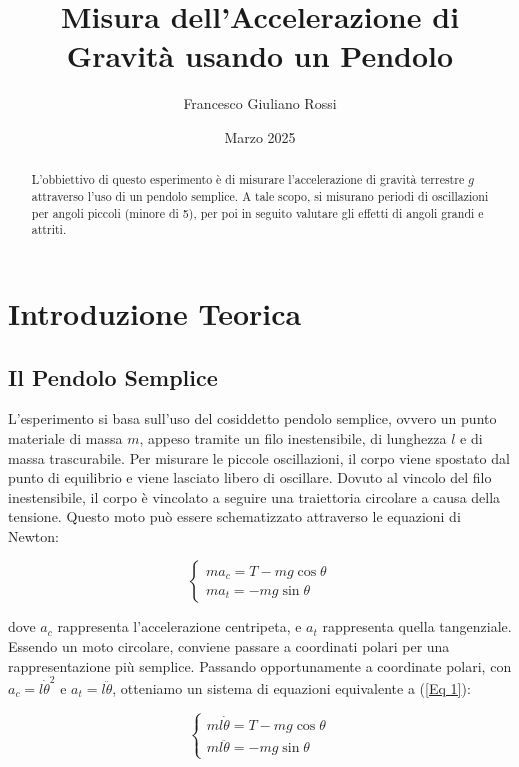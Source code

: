 \documentclass[a4paper]{article}
\title{Misura dell'Accelerazione di Gravità usando un Pendolo}
\author{Francesco Giuliano Rossi}
\date{Marzo 2025}
\begin{document}
\maketitle
\tableofcontents

\newpage
\begin{abstract}
    L'obbiettivo di questo esperimento è di misurare l'accelerazione di gravità terrestre $g$ attraverso l'uso di un pendolo semplice. A tale scopo, si misurano periodi di oscillazioni per angoli piccoli (minore di 5\degree), per poi in seguito valutare gli effetti di angoli grandi e attriti.
\end{abstract}

\section{Introduzione Teorica}
\subsection{Il Pendolo Semplice}
L'esperimento si basa sull'uso del cosiddetto pendolo semplice, ovvero un punto materiale di massa $m$, appeso tramite un filo inestensibile, di lunghezza $l$ e di massa trascurabile. Per misurare le piccole oscillazioni, il corpo viene spostato dal punto di equilibrio e viene lasciato libero di oscillare. Dovuto al vincolo del filo inestensibile, il corpo è vincolato a seguire una traiettoria circolare a causa della tensione. Questo moto può essere schematizzato attraverso le equazioni di Newton:

\begin{equation} \label{Eq 1}
    \left\{
    \begin{array}{lr}
        ma_{c} = T - mg\cos\theta\\
        ma_{t} = -mg\sin\theta
    \end{array}
    \right.
\end{equation}

dove $a_{c}$ rappresenta l'accelerazione centripeta, e $a_{t}$ rappresenta quella tangenziale. Essendo un moto circolare, conviene passare a coordinati polari per una rappresentazione più semplice. Passando opportunamente a coordinate polari, con $a_{c} = l\dot{\theta}^2$ e $a_{t} = l\ddot{\theta}$, otteniamo un sistema di equazioni equivalente a (\ref{Eq 1}):

\begin{equation} \label{Eq 2}
    \left\{
    \begin{array}{lr}
        ml\dot{\theta} = T - mg\cos\theta \\
        ml\ddot{\theta} = -mg\sin\theta
    \end{array}
    \right.
\end{equation}
\end{document}
